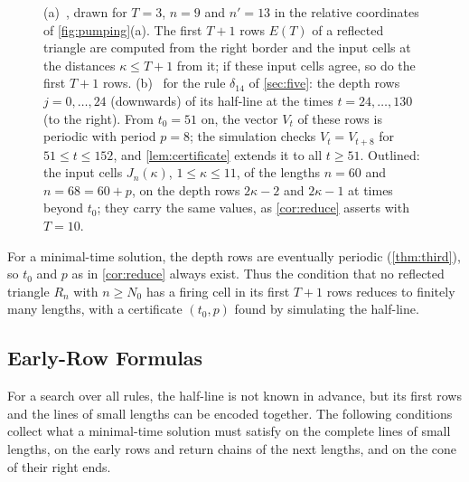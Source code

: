 \begin{figure}[t]
\centering

\caption{(a)~, drawn for $T=3$, $n=9$ and $n'=13$ in the
relative coordinates of \cref{fig:pumping}(a). The first $T+1$ rows $E(T)$ of a
reflected triangle are computed from the right border and the input cells at
the distances $\kappa\le T+1$ from it; if these input cells agree, so do the
first $T+1$ rows. (b)~ for the rule
$\delta_{14}$ of \cref{sec:five}: the depth rows $j=0,\dots,24$ (downwards) of
its half-line at the times $t=24,\dots,130$ (to the right). From $t_0=51$ on,
the vector $V_t$ of these rows is periodic with period $p=8$; the simulation
checks $V_t=V_{t+8}$ for $51\le t\le152$, and \cref{lem:certificate} extends
it to all $t\ge51$. Outlined: the input cells $J_n(\kappa)$, $1\le\kappa\le
11$, of the lengths $n=60$ and $n=68=60+p$, on the depth rows $2\kappa-2$ and
$2\kappa-1$ at times beyond $t_0$; they carry the same values, as
\cref{cor:reduce} asserts with $T=10$.}
\label{fig:early}
\end{figure}

For a minimal-time solution, the depth rows are eventually periodic
(\cref{thm:third}), so $t_0$ and $p$ as in \cref{cor:reduce} always exist.
Thus the condition that no reflected triangle $R_n$ with $n\ge N_0$ has a
firing cell in its first $T+1$ rows reduces to finitely many lengths, with a
certificate $(t_0,p)$ found by simulating the half-line.

\subsection{Early-Row Formulas}

For a search over all rules, the half-line is not known in advance, but its
first rows and the lines of small lengths can be encoded together. The
following conditions collect what a minimal-time solution must satisfy on the
complete lines of small lengths, on the early rows and return chains of the
next lengths, and on the cone of their right ends.

